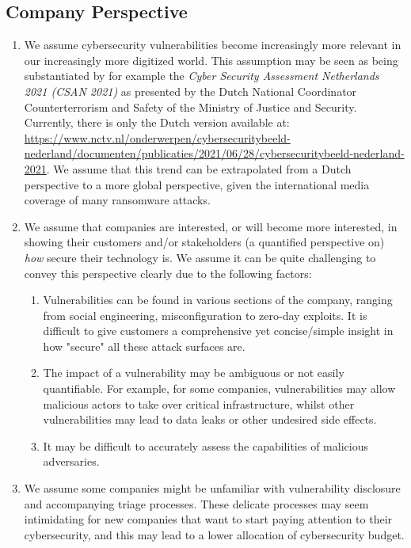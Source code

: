 \subsection{Company Perspective}
\begin{enumerate}
	\item We assume cybersecurity vulnerabilities become increasingly more relevant in our increasingly more digitized world. This assumption may be seen as being substantiated by for example the \textit{Cyber Security Assessment Netherlands 2021 (CSAN 2021)} as presented by the Dutch National Coordinator Counterterrorism and Safety of the Ministry of Justice and Security. Currently, there is only the Dutch version available at: \url{https://www.nctv.nl/onderwerpen/cybersecuritybeeld-nederland/documenten/publicaties/2021/06/28/cybersecuritybeeld-nederland-2021}. We assume that this trend can be extrapolated from a Dutch perspective to a more global perspective, given the international media coverage of many ransomware attacks.
	\item We assume that companies are interested, or will become more interested, in showing their customers and/or stakeholders (a quantified perspective on) \textit{how} secure their technology is. We assume it can be quite challenging to convey this perspective clearly due to the following factors:
	\begin{enumerate}
		\item Vulnerabilities can be found in various sections of the company, ranging from social engineering, misconfiguration to zero-day exploits. It is difficult to give customers a comprehensive yet concise/simple insight in how "secure" all these attack surfaces are.
		\item The impact of a vulnerability may be ambiguous or not easily quantifiable. For example, for some companies, vulnerabilities may allow malicious actors to take over critical infrastructure, whilst other vulnerabilities may lead to data leaks or other undesired side effects.
		\item It may be difficult to accurately assess the capabilities of malicious adversaries.
	\end{enumerate}
	\item We assume some companies might be unfamiliar with vulnerability disclosure and accompanying triage processes. These delicate processes may seem intimidating for new companies that want to start paying attention to their cybersecurity, and this may lead to a lower allocation of cybersecurity budget.
\end{enumerate}